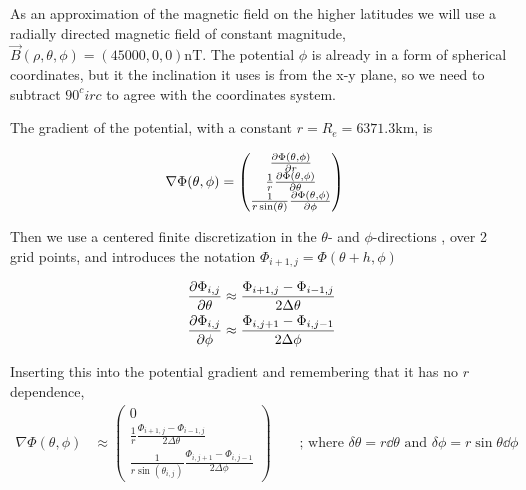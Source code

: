 \documentclass[x11names]{article}
\renewcommand{\va}{\vec}
\begin{document}
    As an approximation of the magnetic field on the higher latitudes we will use a radially directed magnetic field of constant magnitude, \(\va{B}(\rho, \theta, \phi) = (45000,0,0) \si{\nano\tesla}\). The potential \(\phi\) is already in a form of spherical coordinates, but it the inclination it uses is from the x-y plane, so we need to subtract \(90^circ\) to agree with the coordinates system. 

    The gradient of the potential, with a constant \(r = R_e = 6371.3 \si{\kilo \meter}\), is

    \begin{align}
      \nabla \Phi(\theta,\phi) &= 
      \begin{pmatrix}
        \pdv{\Phi(\theta,\phi)}{r}
        \\
        \frac{1}{r} \pdv{\Phi(\theta,\phi)}{\theta}
        \\
        \frac{1}{r\sin(\theta)} \pdv{\Phi(\theta,\phi)}{\phi}
      \end{pmatrix}
    \end{align}

    \noindent Then we use a centered finite discretization in the \(\theta\)- and \(\phi\)-directions , over 2 grid points, and introduces the notation \(\Phi_{i+1,j} = \Phi(\theta + h, \phi)\)

    \begin{align}
      \pdv{\Phi_{i,j}}{\theta} &\approx \frac{ \Phi_{i+1, j} - \Phi_{i - 1, j} }{2 \Delta \theta}
      \\
      \pdv{\Phi_{i,j}}{\phi} &\approx \frac{ \Phi_{i, j + 1} - \Phi_{i , j - 1} }{2\Delta \phi}
    \end{align}

    Inserting this into the potential gradient and remembering that it has no \(r\) dependence,
    \begin{align}
      \nabla \Phi(\theta,\phi) &\approx
      \begin{pmatrix}
        0
        \\
        \frac{1}{r} \frac{ \Phi_{i+1, j} - \Phi_{i - 1, j} }{2 \Delta \theta}
        \\
        \frac{1}{r\sin(\theta_{i,j})}  \frac{ \Phi_{i, j + 1} - \Phi_{i , j - 1} }{2\Delta \phi}
      \end{pmatrix} \label{eq:discretization}
      \qquad{} \text{; where }  \delta \theta = r\dd{\theta} \text{ and } \delta \phi = r \sin{\theta} \dd \phi 
    \end{align}
\end{document}
